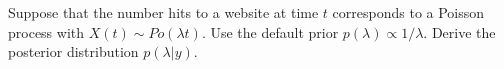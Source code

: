   \item Suppose that the number hits to a website at time $t$ corresponds to a Poisson process with $X(t)\sim Po(\lambda t)$. Use the default prior  $p(\lambda) \propto 1/ \lambda$. Derive the posterior distribution $p(\lambda | y)$.


    \ansfont{
    }
